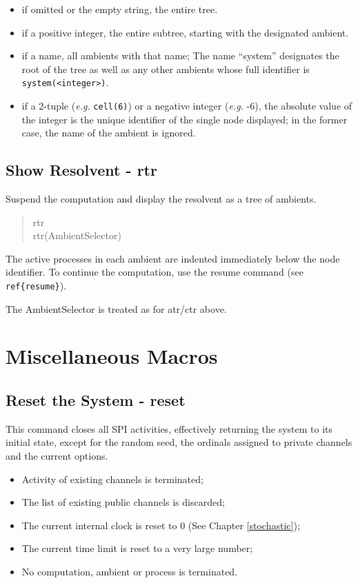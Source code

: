 \begin{itemize}
\item if omitted or the empty string, the entire tree.
\item if a positive integer, the entire subtree, starting with the
  designated ambient.
\item if a name, all ambients with that name;
  The name ``system'' designates the root of the tree as well as
  any other ambients whose full identifier is \verb+system(<integer>)+.
\item if a 2-tuple ({\em e.g.} \verb+cell(6)+) or a negative integer 
  ({\em e.g.} -6), the absolute value of the integer is the unique
  identifier of the single node displayed; in the former case,
  the name of the ambient is ignored.
\end{itemize}

\subsection{Show Resolvent - rtr}
\label{rtr}

Suspend the computation and display the resolvent as a tree of ambients.

\begin{verse}
   rtr \\
   rtr(AmbientSelector)
\end{verse}

\noindent
The active processes in each ambient are indented immediately below 
the node identifier.
To continue the computation, use the resume command
(see \verb+ref{resume}+).

\noindent
The AmbientSelector is treated as for atr/ctr above.

\section{Miscellaneous Macros}

\subsection{Reset the System - reset}
\label{reset}

This command closes all SPI activities,
effectively returning the system to its initial state,
except for the random seed, the ordinals assigned to
private channels and the current options.

\begin{itemize}
\item Activity of existing channels is terminated;
\item The list of existing public channels is discarded;
\item The current internal clock is reset to 0
      (See Chapter \ref{stochastic});
\item The current time limit is reset to a very large number;
\item No computation, ambient or process is terminated.
\end{itemize}


